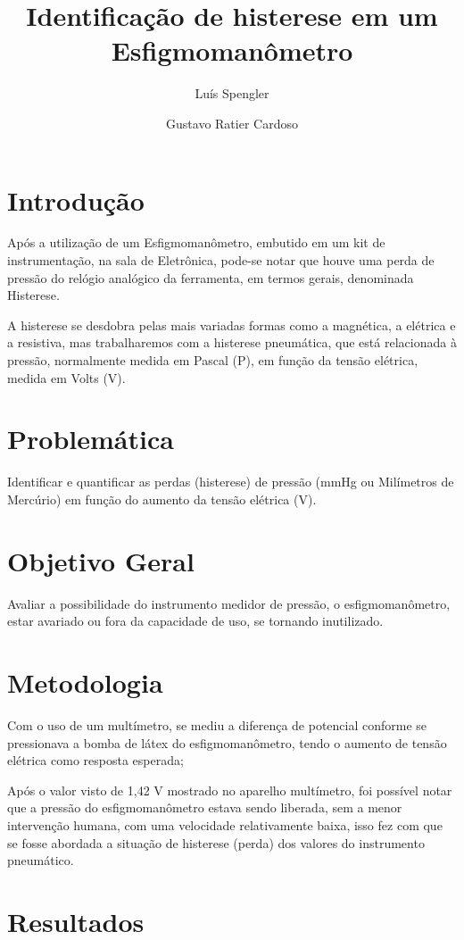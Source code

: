 \documentclass{article}
\title{Identificação de histerese em um Esfigmomanômetro}
\date{}
\author[1]{Luís Spengler}
\author[2]{Gustavo Ratier Cardoso}
\affil[1,2]{Instituto Federal de Educação, Ciência e Tecnologia de Mato Grosso do Sul}
\begin{document}
\maketitle

\section{Introdução}
Após a utilização de um Esfigmomanômetro, embutido em um kit de instrumentação, na sala de Eletrônica, pode-se notar que houve uma perda de pressão do relógio analógico da ferramenta, em termos gerais, denominada Histerese.

A histerese se desdobra pelas mais variadas formas como a magnética, a elétrica e a resistiva, mas trabalharemos com a histerese pneumática, que está relacionada à pressão, normalmente medida em Pascal (P), em função da tensão elétrica, medida em Volts (V).

\section{Problemática}
Identificar e quantificar as perdas (histerese) de pressão (mmHg ou Milímetros de Mercúrio) em função do aumento da tensão elétrica (V).

\section{Objetivo Geral}
Avaliar a possibilidade do instrumento medidor de pressão, o esfigmomanômetro, estar avariado ou fora da capacidade de uso, se tornando inutilizado.

\section{Metodologia}
Com o uso de um multímetro, se mediu a diferença de potencial conforme se pressionava a bomba de látex do esfigmomanômetro, tendo o aumento de tensão elétrica como resposta esperada;

Após o valor visto de 1,42 V mostrado no aparelho multímetro, foi possível notar que a pressão do esfigmomanômetro estava sendo liberada, sem a menor intervenção humana, com uma velocidade relativamente baixa, isso fez com que se fosse abordada a situação de histerese (perda) dos valores do instrumento pneumático.

\section{Resultados}
\end{document}
